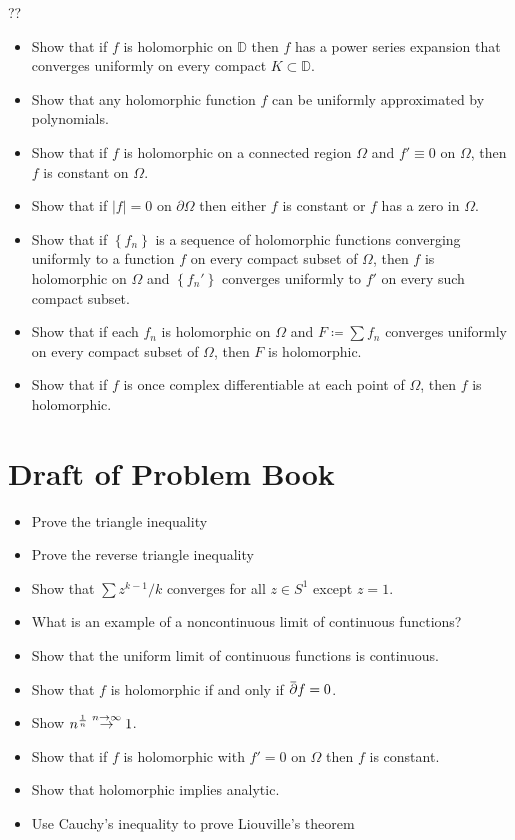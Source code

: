 ??

\begin{itemize}
\item
  Show that if \(f\) is holomorphic on \({\mathbb{D}}\) then \(f\) has a
  power series expansion that converges uniformly on every compact
  \(K\subset {\mathbb{D}}\).
\item
  Show that any holomorphic function \(f\) can be uniformly approximated
  by polynomials.
\item
  Show that if \(f\) is holomorphic on a connected region \(\Omega\) and
  \(f'\equiv 0\) on \(\Omega\), then \(f\) is constant on \(\Omega\).
\item
  Show that if \({\left\lvert {f} \right\rvert} = 0\) on
  \({{\partial}}\Omega\) then either \(f\) is constant or \(f\) has a
  zero in \(\Omega\).
\item
  Show that if \(\left\{{f_n}\right\}\) is a sequence of holomorphic
  functions converging uniformly to a function \(f\) on every compact
  subset of \(\Omega\), then \(f\) is holomorphic on \(\Omega\) and
  \(\left\{{f_n'}\right\}\) converges uniformly to \(f'\) on every such
  compact subset.
\item
  Show that if each \(f_n\) is holomorphic on \(\Omega\) and
  \(F \coloneqq\sum f_n\) converges uniformly on every compact subset of
  \(\Omega\), then \(F\) is holomorphic.
\item
  Show that if \(f\) is once complex differentiable at each point of
  \(\Omega\), then \(f\) is holomorphic.
\end{itemize}

\hypertarget{draft-of-problem-book}{%
\section{Draft of Problem Book}\label{draft-of-problem-book}}

\begin{itemize}
\tightlist
\item
  Prove the triangle inequality
\item
  Prove the reverse triangle inequality
\item
  Show that \(\sum z^{k-1}/k\) converges for all \(z\in S^1\) except
  \(z=1\).
\item
  What is an example of a noncontinuous limit of continuous functions?
\item
  Show that the uniform limit of continuous functions is continuous.
\item
  Show that \(f\) is holomorphic if and only if
  \(\mkern 1.5mu\overline{\mkern-1.5mu{\partial}\mkern-1.5mu}\mkern 1.5muf = 0\).
\item
  Show \(n^{1\over n} \overset{n\to \infty } \to 1\).
\item
  Show that if \(f\) is holomorphic with \(f'=0\) on \(\Omega\) then
  \(f\) is constant.
\item
  Show that holomorphic implies analytic.
\item
  Use Cauchy's inequality to prove Liouville's theorem
\end{itemize}

